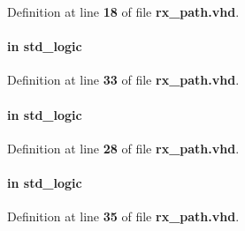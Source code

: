 Definition at line {\bf 18} of file {\bf rx\+\_\+path.\+vhd}.

\paragraph[{drct\+\_\+clk\+\_\+en}]{ {\bfseries \textcolor{keywordflow}{in}\textcolor{vhdlchar}{ }} {\bfseries \textcolor{comment}{std\+\_\+logic}\textcolor{vhdlchar}{ }} \hspace{0.3cm}{\ttfamily [Port]}}\label{classrx__path_a3937d7a368bafd161602e43be8f502dd}


Definition at line {\bf 33} of file {\bf rx\+\_\+path.\+vhd}.

\paragraph[{en}]{ {\bfseries \textcolor{keywordflow}{in}\textcolor{vhdlchar}{ }} {\bfseries \textcolor{comment}{std\+\_\+logic}\textcolor{vhdlchar}{ }} \hspace{0.3cm}{\ttfamily [Port]}}\label{classrx__path_adcf9c6f5161d039addbda5819bee64a3}


Definition at line {\bf 28} of file {\bf rx\+\_\+path.\+vhd}.

\paragraph[{fr\+\_\+start}]{ {\bfseries \textcolor{keywordflow}{in}\textcolor{vhdlchar}{ }} {\bfseries \textcolor{comment}{std\+\_\+logic}\textcolor{vhdlchar}{ }} \hspace{0.3cm}{\ttfamily [Port]}}\label{classrx__path_a2e71bd12426c63495ee40ba7316f5c24}


Definition at line {\bf 35} of file {\bf rx\+\_\+path.\+vhd}.

\paragraph[{ieee}]{\hspace{0.3cm}{\ttfamily [Library]}}\label{classrx__path_a0a6af6eef40212dbaf130d57ce711256}


